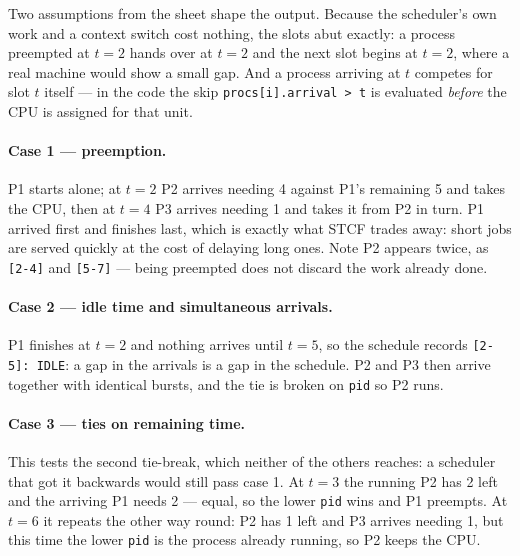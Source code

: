 
Two assumptions from the sheet shape the output. Because the scheduler's own
work and a context switch cost nothing, the slots abut exactly: a process
preempted at $t=2$ hands over at $t=2$ and the next slot begins at $t=2$, where
a real machine would show a small gap. And a process arriving at $t$ competes
for slot $t$ itself --- in the code the skip \texttt{procs[i].arrival > t} is
evaluated \emph{before} the CPU is assigned for that unit.

\paragraph{Case 1 --- preemption.}
P1 starts alone; at $t=2$ P2 arrives needing 4 against P1's remaining 5 and
takes the CPU, then at $t=4$ P3 arrives needing 1 and takes it from P2 in turn.
P1 arrived first and finishes last, which is exactly what STCF trades away:
short jobs are served quickly at the cost of delaying long ones. Note P2
appears twice, as \texttt{[2-4]} and \texttt{[5-7]} --- being preempted does not
discard the work already done.

\paragraph{Case 2 --- idle time and simultaneous arrivals.}
P1 finishes at $t=2$ and nothing arrives until $t=5$, so the schedule records
\texttt{[2-5]: IDLE}: a gap in the arrivals is a gap in the schedule. P2 and P3
then arrive together with identical bursts, and the tie is broken on
\texttt{pid} so P2 runs.

\paragraph{Case 3 --- ties on remaining time.}
This tests the second tie-break, which neither of the others reaches: a
scheduler that got it backwards would still pass case 1. At $t=3$ the running
P2 has 2 left and the arriving P1 needs 2 --- equal, so the lower \texttt{pid}
wins and P1 preempts. At $t=6$ it repeats the other way round: P2 has 1 left and
P3 arrives needing 1, but this time the lower \texttt{pid} is the process
already running, so P2 keeps the CPU.

